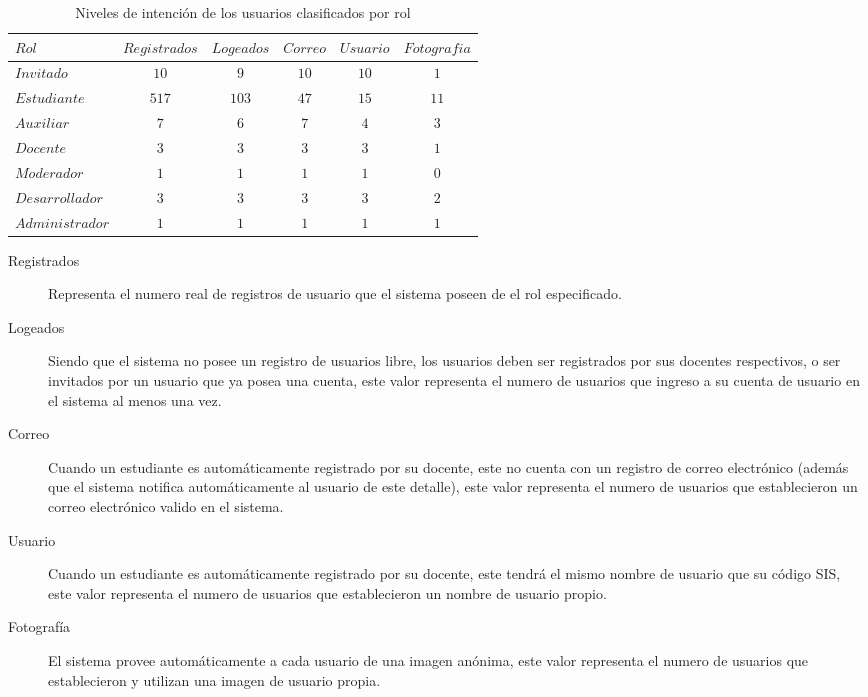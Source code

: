 \begin{table}
\centering
\begin{tabular}{l|c c c c c}
$Rol$ & $Registrados$ & $Logeados$ & $Correo$ & $Usuario$ & $Fotografia$ \\
\hline
$Invitado$      & $ 10$ & $  9$ & $10$ & $10$ & $ 1$ \\
$Estudiante$    & $517$ & $103$ & $47$ & $15$ & $11$ \\
$Auxiliar$      & $  7$ & $  6$ & $ 7$ & $ 4$ & $ 3$ \\
$Docente$       & $  3$ & $  3$ & $ 3$ & $ 3$ & $ 1$ \\
$Moderador$     & $  1$ & $  1$ & $ 1$ & $ 1$ & $ 0$ \\
$Desarrollador$ & $  3$ & $  3$ & $ 3$ & $ 3$ & $ 2$ \\
$Administrador$ & $  1$ & $  1$ & $ 1$ & $ 1$ & $ 1$ \\
\end{tabular}
\caption{Niveles de intención de los usuarios clasificados por rol}
\label{usuarios_tabla_1}
\end{table}

\begin{description}
\item [Registrados] Representa el numero real de registros de usuario que el
sistema poseen de el rol especificado.
\item [Logeados] Siendo que el sistema no posee un registro de usuarios libre,
los usuarios deben ser registrados por sus docentes respectivos, o ser invitados
por un usuario que ya posea una cuenta, este valor representa el numero de
usuarios que ingreso a su cuenta de usuario en el sistema al menos una vez.
\item [Correo] Cuando un estudiante es automáticamente registrado por su
docente, este no cuenta con un registro de correo electrónico (además que el
sistema notifica automáticamente al usuario de este detalle), este valor
representa el numero de usuarios que establecieron un correo electrónico valido
en el sistema.
\item [Usuario] Cuando un estudiante es automáticamente registrado por su
docente, este tendrá el mismo nombre de usuario que su código SIS, este valor
representa el numero de usuarios que establecieron un nombre de usuario propio.
\item [Fotografía] El sistema provee automáticamente a cada usuario de una
imagen anónima, este valor representa el numero de usuarios que establecieron
y utilizan una imagen de usuario propia.
\end{description}

